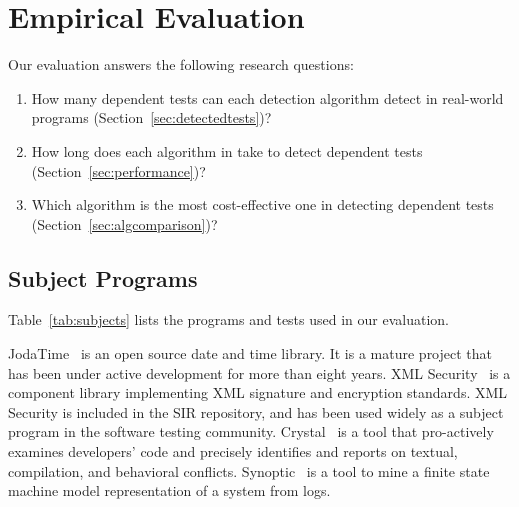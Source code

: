 \section{Empirical Evaluation}
\label{sec:evaluation}



\newcommand{\jodatimetests}{3875\xspace}
\newcommand{\xmlsecuritytests}{108\xspace}
\newcommand{\crystaltests}{75\xspace}
\newcommand{\synoptictests}{118\xspace}
\newcommand{\totaltests}{4176\xspace}

\newcommand{\jodatimeautotests}{2639\xspace}
\newcommand{\xmlsecurityautotests}{665\xspace}
\newcommand{\crystalautotests}{3198\xspace}
\newcommand{\synopticautotests}{2467\xspace}
\newcommand{\totalautotests}{8969\xspace}




Our evaluation answers the following research questions:

\vspace{-1mm}

\begin{enumerate}
\vspace{-1mm}
\item How many dependent tests can each detection
algorithm detect in
real-world programs (Section~\ref{sec:detectedtests})?

\item How long does each algorithm in \ourtool take to detect dependent
tests (Section~\ref{sec:performance})?

\item Which algorithm is the most cost-effective one in detecting
dependent tests (Section~\ref{sec:algcomparison})?
\end{enumerate}

\subsection{Subject Programs}


Table~\ref{tab:subjects} lists the programs and
tests used in our evaluation.

JodaTime~\cite{jodatime} is an open source
date and time library. It is a mature project that
has been under active development
for more than eight years. XML Security~\cite{xmlsecurity}
is a component library implementing XML signature and encryption
standards. XML Security is included in
the SIR repository, and has been used widely
as a subject program in the software testing community.
Crystal~\cite{crystal} is a tool that
pro-actively examines developers' code and
precisely identifies and reports on textual,
compilation, and behavioral conflicts.
Synoptic~\cite{synoptic} is a tool to mine a finite state
machine model representation of a system from logs.

